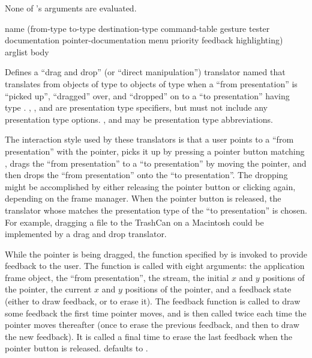 None of 's arguments are evaluated.


 {name
                                             (from-type to-type destination-type command-table 
                                              \key gesture tester
                                                   documentation pointer-documentation
                                                   menu priority
                                                   feedback highlighting)
                                             arglist
                                             \body body}

Defines a ``drag and drop'' (or ``direct manipulation'') translator named
 that translates from objects of type  to objects of
type  when a ``from presentation'' is ``picked up'', ``dragged''
over, and ``dropped'' on to a ``to presentation'' having type
.  , , and
 are presentation type specifiers, but must not include
any presentation type options.  ,  and
 may be presentation type abbreviations.

The interaction style used by these translators is that a user points to a
``from presentation'' with the pointer, picks it up by pressing a pointer button
matching , drags the ``from presentation'' to a ``to presentation''
by moving the pointer, and then drops the ``from presentation'' onto the ``to
presentation''.  The dropping might be accomplished by either releasing the
pointer button or clicking again, depending on the frame manager.  When the
pointer button is released, the translator whose  matches
the presentation type of the ``to presentation'' is chosen.  For example,
dragging a file to the TrashCan on a Macintosh could be implemented by a drag
and drop translator.

While the pointer is being dragged, the function specified by  is
invoked to provide feedback to the user.  The function is called with eight
arguments: the application frame object, the ``from presentation'', the stream,
the initial $x$ and $y$ positions of the pointer, the current $x$ and $y$
positions of the pointer, and a feedback state (either  to draw
feedback, or  to erase it).  The feedback function is called to
draw some feedback the first time pointer moves, and is then called twice each
time the pointer moves thereafter (once to erase the previous feedback, and then
to draw the new feedback).  It is called a final time to erase the last feedback
when the pointer button is released.   defaults to
.

